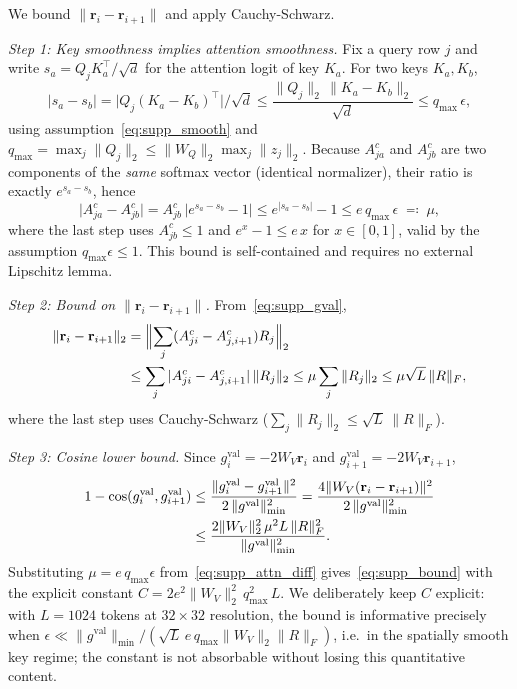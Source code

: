 \begin{IEEEproof}
We bound $\|\mathbf{r}_i - \mathbf{r}_{i+1}\|$ and apply Cauchy-Schwarz.

\emph{Step 1: Key smoothness implies attention smoothness.}
Fix a query row $j$ and write $s_a = Q_j K_a^\top/\sqrt{d}$ for the attention
logit of key $K_a$.
For two keys $K_a, K_b$,
\begin{equation}
  |s_a - s_b|
  = \bigl|Q_j (K_a - K_b)^\top\bigr|/\sqrt{d}
  \leq \frac{\|Q_j\|_2\,\|K_a - K_b\|_2}{\sqrt{d}}
  \leq q_{\max}\,\epsilon,
  \label{eq:supp_logit_diff}
\end{equation}
using assumption~\eqref{eq:supp_smooth} and
$q_{\max} = \max_j\|Q_j\|_2 \leq \|W_Q\|_2 \max_j \|z_j\|_2$.
Because $A^c_{ja}$ and $A^c_{jb}$ are two components of the \emph{same}
softmax vector (identical normalizer), their ratio is exactly
$e^{s_a - s_b}$, hence
\begin{equation}
  \bigl|A_{ja}^c - A_{jb}^c\bigr|
  = A_{jb}^c\,\bigl|e^{s_a - s_b} - 1\bigr|
  \leq e^{|s_a - s_b|} - 1
  \leq e\, q_{\max}\,\epsilon
  \;\eqqcolon\; \mu,
  \label{eq:supp_attn_diff}
\end{equation}
where the last step uses $A_{jb}^c \leq 1$ and
$e^x - 1 \leq e\,x$ for $x \in [0,1]$, valid by the assumption
$q_{\max}\epsilon \leq 1$.
This bound is self-contained and requires no external Lipschitz lemma.

\emph{Step 2: Bound on $\|\mathbf{r}_i - \mathbf{r}_{i+1}\|$.}
From~\eqref{eq:supp_gval},
\begin{align}
  \|\mathbf{r}_i - \mathbf{r}_{i+1}\|_2
  &= \Bigl\|\sum_j (A_{ji}^c - A_{j,i+1}^c) R_j\Bigr\|_2 \notag\\
  &\leq \sum_j |A_{ji}^c - A_{j,i+1}^c|\,\|R_j\|_2
   \leq \mu \sum_j \|R_j\|_2
   \leq \mu\sqrt{L}\,\|R\|_F,
  \label{eq:supp_r_diff}
\end{align}
where the last step uses Cauchy-Schwarz ($\sum_j\|R_j\|_2 \leq \sqrt{L}\,\|R\|_F$).

\emph{Step 3: Cosine lower bound.}
Since $g_i^{\mathrm{val}} = -2W_V\mathbf{r}_i$ and
$g_{i+1}^{\mathrm{val}} = -2W_V\mathbf{r}_{i+1}$,
\begin{align}
  1 - \cos(g_i^{\mathrm{val}}, g_{i+1}^{\mathrm{val}})
  &\leq \frac{\|g_i^{\mathrm{val}} - g_{i+1}^{\mathrm{val}}\|^2}{2\,\|g^{\mathrm{val}}\|_{\min}^2}
   = \frac{4\|W_V(\mathbf{r}_i-\mathbf{r}_{i+1})\|^2}{2\,\|g^{\mathrm{val}}\|_{\min}^2} \notag\\
  &\leq \frac{2\|W_V\|_2^2\,\mu^2 L\,\|R\|_F^2}{\|g^{\mathrm{val}}\|_{\min}^2}.
  \label{eq:supp_cos_step}
\end{align}
Substituting $\mu = e\,q_{\max}\epsilon$
from~\eqref{eq:supp_attn_diff} gives~\eqref{eq:supp_bound} with the explicit
constant $C = 2e^2\|W_V\|_2^2\,q_{\max}^2\,L$.
We deliberately keep $C$ explicit: with $L = 1024$ tokens at $32\times32$
resolution, the bound is informative precisely when
$\epsilon \ll \|g^{\mathrm{val}}\|_{\min} /
(\sqrt{L}\,e\,q_{\max}\|W_V\|_2\|R\|_F)$, i.e.\ in the spatially smooth key
regime; the constant is not absorbable without losing this quantitative
content.
\end{IEEEproof}

